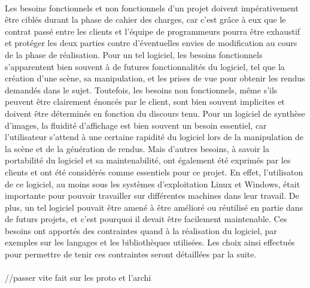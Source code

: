 \paragraph{}
        Les besoins fonctionnels et non fonctionnels d'un projet doivent impérativement être ciblés durant la phase de cahier des charges, car c'est grâce à eux que le contrat passé entre les clients et l'équipe de programmeurs pourra être exhaustif et protéger les deux parties contre d'éventuelles envies de modification au cours de la phase de réalisation. 
Pour un tel logiciel, les besoins fonctionnels s'apparentent bien souvent à de futures fonctionnalités du logiciel, tel que la création d'une scène, sa manipulation, et les prises de vue pour obtenir les rendus demandés dans le sujet. 
Toutefois, les besoins non fonctionnels, même s'ils peuvent être clairement énoncés par le client, sont bien souvent implicites et doivent être déterminés en fonction du discours tenu. Pour un logiciel de synthèse d'images, la fluidité d'affichage est bien souvent un besoin essentiel, car l'utilisateur s'attend à une certaine rapidité du logiciel lors de la manipulation de la scène et de la génération de rendus. Mais d'autres besoins, à savoir la portabilité du logiciel et sa maintenabilité, ont également été exprimés par les clients et ont été considérés comme essentiels pour ce projet. En effet, l'utilisaton de ce logiciel, au moins sous les systèmes d'exploitation Linux et Windows, était importante pour pouvoir travailler sur différentes machines dans leur travail. De plus, un tel logiciel pouvait être amené à être amélioré ou réutilisé en partie dans de futurs projets, et c'est pourquoi il devait être facilement maintenable.
Ces besoins ont apportés des contraintes quand à la réalisation du logiciel, par exemples sur les langages et les bibliothèques utilisées. Les choix ainsi effectués pour permettre de tenir ces contraintes seront détaillées par la suite.

\paragraph{}
        //passer vite fait sur les proto et l'archi
